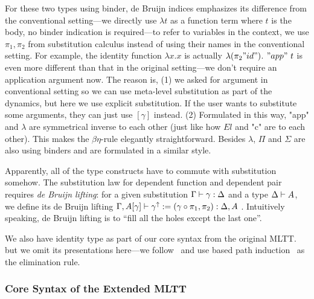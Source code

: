 For these two types using binder, de Bruijn indices emphasizes its
difference from the conventional setting---we directly use $\lambda t$
as a function term where $t$ is the body, no binder indication is
required---to refer to variables in the context, we use $\pi_1,\pi_2$
from substitution calculus instead of using their names in the
conventional setting.  For example, the identity function $\lambda x. x$
is actually $\lambda(\pi_2 "id")$. $"app"~t$ is even more different than
that in the original setting---we don't require an application argument
now. The reason is, (1) we asked for argument in conventional setting so
we can use meta-level substitution as part of the dynamics, but here we
use explicit substitution. If the user wants to substitute some
arguments, they can just use $[\gamma]$ instead. (2) Formulated in this
way, "app" and $\lambda$ are symmetrical inverse to each other (just like
how $El$ and "c" are to each other). This makes the $\beta\eta$-rule
elegantly straightforward. Besides $\lambda$, $\Pi$ and $\Sigma$ are
also using binders and are formulated in a similar style.


Apparently, all of the type constructs have to commute with substitution somehow. The substitution law for dependent function and dependent pair
requires \textit{de Bruijn lifting}: for a given substitution
${ {\Gamma} \vdash {\gamma} : {\Delta} }$ and a type
${ {\Delta} \vdash {A} }$, we define its de Bruijn lifting
${ {\Gamma,A[\gamma]} \vdash {\gamma^\uparrow := (\gamma \circ \pi_1, \pi_2)} : {\Delta, A} }$ . Intuitively speaking, de Bruijn lifting is to ``fill all the holes except the last one''.

We also have identity type as part of our core syntax from the original MLTT. but we omit its presentations here---we follow~\citet{kaposi2019gluing} and use based path induction~\citet{program2013homotopy} as the elimination rule.  

\subsubsection{\textbf{Core Syntax of the Extended MLTT}}

